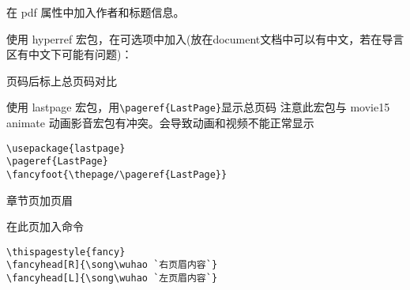 \begin{list}


\item
\color{red}
在 pdf 属性中加入作者和标题信息。\\
\normalcolor

        使用 hyperref 宏包，在可选项中加入(放在document文档中可以有中文，若在导言区有中文\XeLaTeX 下可能有问题)：\\




\item
\color{red}
页码后标上总页码对比\\
\normalcolor

使用 lastpage 宏包，用\verb|\pageref{LastPage}|显示总页码
\textcolor[rgb]{1.00,0.00,0.00}{注意此宏包与 movie15 animate 动画影音宏包有冲突。会导致动画和视频不能正常显示}
\begin{shaded}
\begin{Verbatim}
\usepackage{lastpage}
\pageref{LastPage}
\fancyfoot{\thepage/\pageref{LastPage}}
\end{Verbatim}
\end{shaded}

\item
\color{red}
章节页加页眉\\
\normalcolor


在此页加入命令
\begin{lstlisting}[language={[LaTeX]TeX}]
\thispagestyle{fancy}
\fancyhead[R]{\song\wuhao `右页眉内容`}
\fancyhead[L]{\song\wuhao `左页眉内容`}
\end{lstlisting}






\end{list}
